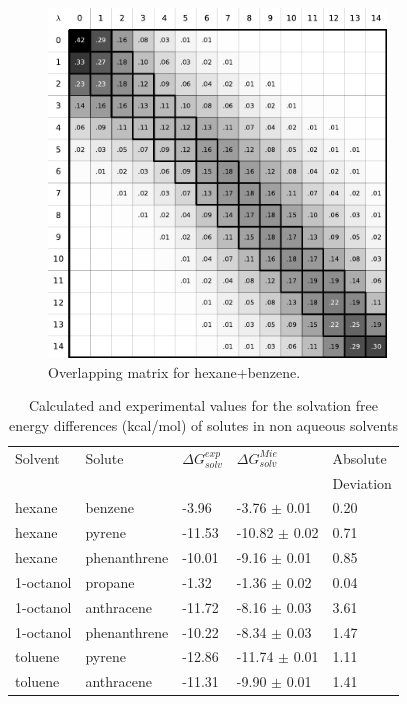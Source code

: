 \FloatBarrier
\begin{figure}[h]
    \centering
    \includegraphics[width=0.8\textwidth]{Figures/ohex_benz}
    \caption{Overlapping matrix for hexane+benzene.}
    \label{fig:hexove}
\end{figure}

\begin{table}[h]
\centering
  \caption{Calculated and experimental values for the solvation free energy differences (kcal/mol) of solutes in non aqueous solvents}
  \label{tbl:solv1}
  \begin{tabular}{lllll}
    \hline
      Solvent & Solute & $\Delta G_{solv}^{exp}$&  $\Delta G_{solv}^{Mie}$ & Absolute \\
      & & & & Deviation \\
    \hline
    hexane    & benzene      & -3.96  & -3.76  $\pm$ 0.01 & 0.20 \\
    hexane    & pyrene       & -11.53& -10.82 $\pm$ 0.02 & 0.71 \\
    hexane    & phenanthrene & -10.01& -9.16  $\pm$ 0.01 & 0.85 \\
    1-octanol & propane      & -1.32  & -1.36  $\pm$ 0.02 & 0.04 \\
    1-octanol & anthracene   & -11.72&  -8.16  $\pm$ 0.03 & 3.61 \\
    1-octanol & phenanthrene & -10.22&  -8.34  $\pm$ 0.03 & 1.47 \\
    toluene   & pyrene       & -12.86&  -11.74 $\pm$ 0.01 & 1.11\\
    toluene   & anthracene   & -11.31&  -9.90 $\pm$ 0.01 & 1.41\\
    \hline
  \end{tabular}
\end{table}
\FloatBarrier

